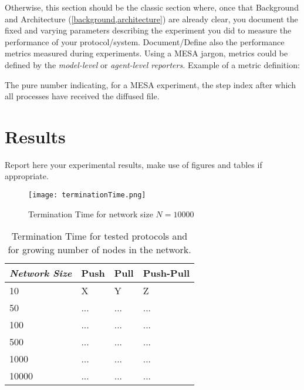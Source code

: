 \documentclass[11pt]{scrartcl} %
\begin{document}
Otherwise, this section should be the classic section where, once that Background and Architecture (\cref{background,architecture})
are already clear, you document the fixed and varying parameters describing the experiment you did to measure the performance of your protocol/system.
Document/Define also the performance metrics measured during experiments. Using a MESA jargon, metrics could be defined by
the \textit{model-level} or \textit{agent-level reporters.} Example of a metric definition:

\begin{definition*}
The pure number indicating, for a MESA experiment, the step index after which all processes have received the diffused file. 
\end{definition*}

\section{Results}\label{results}

Report here your experimental results, make use of figures and tables if appropriate.

\begin{figure}[h] %
	\centering
	\texttt{[image: terminationTime.png]} %
	\caption{Termination Time for network size $N = 10000$}
\end{figure}

\begin{table}[h] %
	\centering %
	\begin{tabular}{l l l l}
		\toprule
		\textit{Network Size} & \textbf{Push} & \textbf{Pull} & \textbf{Push-Pull} \\
		\midrule
		10    & X & Y & Z\\
		50    & ... & ... & ...\\
		100   & ... & ... & ...\\
		500   & ... & ... & ...\\
		1000  & ... & ... & ...\\
		10000 & ... & ... & ...\\
		\bottomrule
	\end{tabular}
	\caption{Termination Time for tested protocols and for growing number of nodes in the network.}
\end{table}
\end{document}
